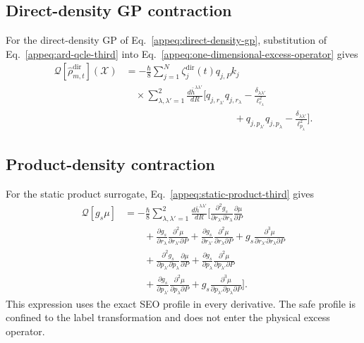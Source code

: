 \documentclass[
  11pt,
  letterpaper,
  onehalfspacing,
  normalmargins,
  equalmargins,
  oneside
]{ut-thesis}
\begin{document}
\subsection{Direct-density GP contraction}
\label{appsubsec:direct-q-contraction}

For the direct-density GP of
Eq.~\eqref{appeq:direct-density-gp}, substitution of
Eq.~\eqref{appeq:ard-qcle-third} into
Eq.~\eqref{appeq:one-dimensional-excess-operator} gives
\begin{align}
\mathcal Q
\left[
\widehat{\rho}_{m,t}^{\mathrm{dir}}
\right]
(\boldsymbol{\mathcal X})
&=
-\frac{\hbar}{8}
\sum_{j=1}^{N}
\zeta_j^{\mathrm{dir}}(t)
q_{j,P}k_j
\nonumber\\
&\quad\times
\sum_{\lambda,\lambda'=1}^{2}
\frac{d\bar h^{\lambda\lambda'}}{dR}
\Bigg[
q_{j,r_{\lambda'}}
q_{j,r_\lambda}
-
\frac{
\delta_{\lambda\lambda'}
}{
\ell_{r_\lambda}^2
}
\nonumber\\
&\hspace{11em}
+
q_{j,p_{\lambda'}}
q_{j,p_\lambda}
-
\frac{
\delta_{\lambda\lambda'}
}{
\ell_{p_\lambda}^2
}
\Bigg].
\label{appeq:direct-q-contraction}
\end{align}

\subsection{Product-density contraction}
\label{appsubsec:product-q-contraction}

For the static product surrogate, Eq.~\eqref{appeq:static-product-third}
gives
\begin{align}
\mathcal Q[g_s\mu]
&=
-\frac{\hbar}{8}
\sum_{\lambda,\lambda'=1}^{2}
\frac{d\bar h^{\lambda\lambda'}}{dR}
\Bigg[
\frac{\partial^2g_s}
{\partial r_{\lambda'}\partial r_\lambda}
\frac{\partial\mu}{\partial P}
\nonumber\\
&\qquad+
\frac{\partial g_s}{\partial r_\lambda}
\frac{\partial^2\mu}
{\partial r_{\lambda'}\partial P}
+
\frac{\partial g_s}{\partial r_{\lambda'}}
\frac{\partial^2\mu}
{\partial r_\lambda\partial P}
+
g_s
\frac{\partial^3\mu}
{\partial r_{\lambda'}\partial r_\lambda\partial P}
\nonumber\\
&\qquad+
\frac{\partial^2g_s}
{\partial p_{\lambda'}\partial p_\lambda}
\frac{\partial\mu}{\partial P}
+
\frac{\partial g_s}{\partial p_\lambda}
\frac{\partial^2\mu}
{\partial p_{\lambda'}\partial P}
\nonumber\\
&\qquad+
\frac{\partial g_s}{\partial p_{\lambda'}}
\frac{\partial^2\mu}
{\partial p_\lambda\partial P}
+
g_s
\frac{\partial^3\mu}
{\partial p_{\lambda'}\partial p_\lambda\partial P}
\Bigg].
\label{appeq:product-q-contraction}
\end{align}
This expression uses the exact SEO profile in every derivative. The safe
profile is confined to the label transformation and does not enter the
physical excess operator.
\end{document}
